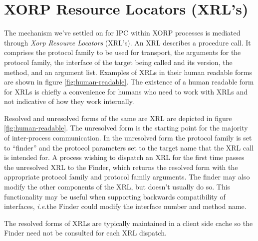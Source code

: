 \documentclass[11pt]{article}
\newcommand{\ie}{\emph{i.e.\/}} %
\begin{document}
\section{XORP Resource Locators (XRL's)}

The mechanism we've settled on for IPC within XORP processes is mediated
through \emph{Xorp Resource Locators} (XRL's).  An XRL describes a
procedure call.  It comprises the protocol family to be used for
transport, the arguments for the protocol family, the interface of the
target being called and its version, the method, and an argument
list.  Examples of XRLs in their human readable forms are shown in
figure \ref{fig:human-readable}.  The existence of a human readable
form for XRLs is chiefly a convenience for humans who need to work
with XRLs and not indicative of how they work internally.

Resolved and unresolved forms of the same are XRL are depicted in
figure \ref{fig:human-readable}.  The unresolved form is the starting
point for the majority of inter-process communication.  In the
unresolved form the protocol family is set to ``finder'' and the
protocol parameters set to the target name that the XRL call is
intended for.  A process wishing to dispatch an XRL for the first time
passes the unresolved XRL to the Finder, which returns the resolved
form with the appropriate protocol family and protocol family
arguments.  The finder may also modify the other components of the
XRL, but doesn't usually do so.  This functionality may be useful when
supporting backwards compatibility of interfaces, \ie the Finder could
modify the interface number and method name.

The resolved forms of XRLs are typically maintained in a client side
cache so the Finder need not be consulted for each XRL dispatch.
\end{document}
